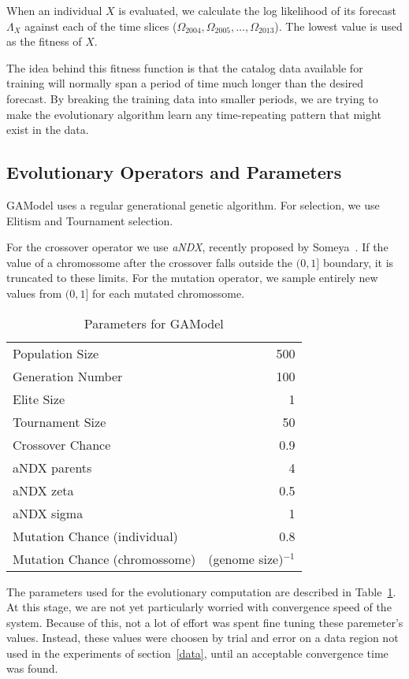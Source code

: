 \documentclass{sig-alternate}
\begin{document}
When an individual $X$ is evaluated, we calculate the log likelihood
of its forecast $\Lambda_X$ against each of the time slices
($\Omega_{2004}, \Omega_{2005}, \dots, \Omega_{2013}$). The lowest
value is used as the fitness of $X$.

The idea behind this fitness function is that the catalog data
available for training will normally span a period of time much longer
than the desired forecast. By breaking the training data into smaller
periods, we are trying to make the evolutionary algorithm learn any
time-repeating pattern that might exist in the data.

\subsection{Evolutionary Operators and Parameters} %

GAModel uses a regular generational genetic algorithm. For selection,
we use Elitism and Tournament selection. 

For the crossover operator we use \emph{aNDX}, recently proposed by
Someya~\cite{Someya2013}. If the value of a chromossome after the
crossover falls outside the $(0,1]$ boundary, it is truncated to these
  limits. For the mutation operator, we sample entirely new values
  from $(0,1]$ for each mutated chromossome.

\begin{table}[!h]
  \begin{center}
  \begin{tabular}{|l|r|}
    \hline
    Population Size & 500\\
    Generation Number & 100\\
    Elite Size & 1\\
    Tournament Size & 50\\
    Crossover Chance & 0.9\\
    aNDX parents & 4\\
    aNDX zeta & 0.5\\
    aNDX sigma & 1\\
    Mutation Chance (individual) & 0.8\\
    Mutation Chance (chromossome) & (genome size)$^{-1}$\\
    \hline    
  \end{tabular}
  \end{center}
  \caption{Parameters for GAModel}
  \label{GAParameters}
\end{table}

The parameters used for the evolutionary computation are described in
Table~\ref{GAParameters}. At this stage, we are not yet particularly
worried with convergence speed of the system. Because of this, not a
lot of effort was spent fine tuning these paremeter's values. Instead,
these values were choosen by trial and error on a data region not used
in the experiments of section~\ref{data}, until an acceptable
convergence time was found.
\end{document}
